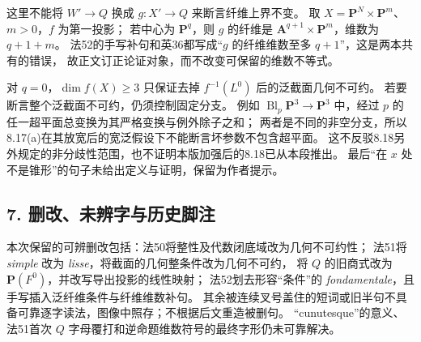 \documentclass[UTF8,a4paper]{ctexbook}
\begin{document}
这里不能将 $W'\to Q$ 换成 $g:X'\to Q$ 来断言纤维上界不变。
取 $X=\mathbf P^N\times\mathbf P^m$、$m>0$，$f$ 为第一投影；
若中心为 $\mathbf P^q$，则 $g$ 的纤维是
$\mathbf A^{q+1}\times\mathbf P^m$，维数为 $q+1+m$。
法52的手写补句和英36都写成“$g$ 的纤维维数至多 $q+1$”，这是两本共有的错误，
故正文订正论证对象，而不改变可保留的维数不等式。

对 $q=0$，$\dim f(X)\ge3$ 只保证去掉 $f^{-1}(L^0)$ 后的泛截面几何不可约。
若要断言整个泛截面不可约，仍须控制固定分支。
例如 $\operatorname{Bl}_p\mathbf P^3\to\mathbf P^3$ 中，经过 $p$ 的任一超平面总变换为其严格变换与例外除子之和；
两者是不同的非空分支，所以8.17(a)在其放宽后的宽泛假设下不能断言坏参数不包含超平面。
这不反驳8.18另外规定的非分歧性范围，也不证明本版加强后的8.18已从本段推出。
最后“在 $x$ 处不是锥形”的句子未给出定义与证明，保留为作者提示。

\subsection*{7. 删改、未辨字与历史脚注}

本次保留的可辨删改包括：法50将整性及代数闭底域改为几何不可约性；
法51将 \emph{simple} 改为 \emph{lisse}，将截面的几何整条件改为几何不可约，
将 $Q$ 的旧商式改为 $\mathbf P(F^0)$，并改写导出投影的线性映射；
法52划去形容“条件”的 \emph{fondamentale}，且手写插入泛纤维条件与纤维维数补句。
其余被连续叉号盖住的短词或旧半句不具备可靠逐字读法，图像中照存；不根据后文重造被删句。
“cunutesque”的意义、法51首次 $Q$ 字母覆打和逆命题维数符号的最终字形仍未可靠解决。
\end{document}
